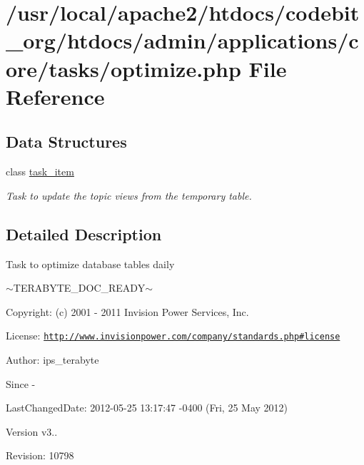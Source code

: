 \hypertarget{optimize_8php}{\section{/usr/local/apache2/htdocs/codebit\-\_\-org/htdocs/admin/applications/core/tasks/optimize.php File Reference}
\label{optimize_8php}
}
\subsection*{Data Structures}
\begin{DoxyCompactItemize}
\item 
class \hyperlink{classtask__item}{task\-\_\-item}
\begin{DoxyCompactList}\small\item\em Task to update the topic views from the temporary table. \end{DoxyCompactList}\end{DoxyCompactItemize}


\subsection{Detailed Description}
\begin{DoxyVerb}  Task to optimize database tables daily
\end{DoxyVerb}
 $\sim$\-T\-E\-R\-A\-B\-Y\-T\-E\-\_\-\-D\-O\-C\-\_\-\-R\-E\-A\-D\-Y$\sim$ \begin{DoxyParagraph}{Copyright\-:}
(c) 2001 -\/ 2011 Invision Power Services, Inc.
\end{DoxyParagraph}
\begin{DoxyParagraph}{License\-:}
\href{http://www.invisionpower.com/company/standards.php#license}{\tt http\-://www.\-invisionpower.\-com/company/standards.\-php\#license}
\end{DoxyParagraph}
\begin{DoxyParagraph}{Author\-:}
ips\-\_\-terabyte 
\end{DoxyParagraph}
\begin{DoxySince}{Since}
-\/ 
\end{DoxySince}
\begin{DoxyParagraph}{Last\-Changed\-Date\-:}
2012-\/05-\/25 13\-:17\-:47 -\/0400 (Fri, 25 May 2012) 
\end{DoxyParagraph}
\begin{DoxyVersion}{Version}
v3.. 
\end{DoxyVersion}
\begin{DoxyParagraph}{Revision\-:}
10798 
\end{DoxyParagraph}
